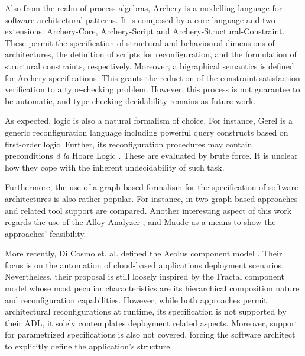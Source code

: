 		
		Also from the realm of process algebras, Archery \cite{conf/facs2/SanchezBR11} is a modelling
	language for software architectural patterns. It is composed by a core language and two extensions:
	\textsf{Archery-Core}, \textsf{Archery-Script} and \textsf{Archery-Structural-Constraint}.
	These permit the specification of structural and behavioural dimensions of architectures,
	the definition of scripts for  reconfiguration, and the formulation of structural constraints,
	respectively. Moreover, a bigraphical semantics is defined for Archery specifications. This grants
	the reduction of the constraint satisfaction verification to a type-checking problem. However,
	this process is not guarantee to be automatic, and type-checking decidability remains as future work.
	
	
				
		
	As expected, logic is also a natural formalism of choice. For instance, Gerel \cite{endler1992}
	is a generic reconfiguration language including powerful query constructs based on first-order logic.
	Further, its reconfiguration procedures may contain preconditions \textit{\`a la} 
	Hoare Logic \cite{Hoare69anaxiomatic}. These are evaluated by brute force. It is unclear
	how they cope with the inherent undecidability of such task. 


	Furthermore, the use of a graph-based formalism for the specification of software architectures
	is also rather popular. For instance, in \cite{Bruni:2008:GDA:1424922.1424928} two graph-based
	approaches and related tool support are compared. Another interesting aspect of this work
	regards the use of the Alloy Analyzer \cite{Jackson:2002:ALO:505145.505149}, 
	and Maude \cite{Clavel:2002:MSP:633559.633563} as a means to show the approaches' feasibility. 
		

		More recently, 	Di Cosmo et. al. defined the Aeolus component model \cite{conf/sefm/CosmoZZ12}. Their focus
	is on the automation of cloud-based applications deployment scenarios. Nevertheless, their 
    proposal is still loosely inspired by the Fractal component model \cite{fractalSpec} whose
	most peculiar characteristics are its hierarchical composition nature and reconfiguration capabilities.
	However, while both approaches permit architectural reconfigurations at runtime, 
    its specification is not supported by their ADL, it solely contemplates deployment related
    aspects. Moreover, support for
	parametrized specifications is also not covered, forcing the software architect to explicitly 	
	define the application's structure.    
	

